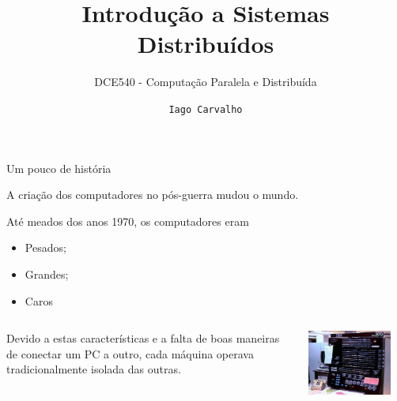 \documentclass[compress]{beamer}
\title{Introdução a Sistemas \\ Distribuídos}
\subtitle{DCE540 - Computação Paralela e Distribuída}
\author{\texttt{Iago Carvalho}}
\institute{\texttt{Departamento de Ciência da Computação}}
\begin{document}
\begin{frame}
\titlepage

\end{frame}


\begin{frame}{Um pouco de história}

A criação dos computadores no pós-guerra mudou o mundo.

\vspace{0.5cm}

Até meados dos anos 1970, os computadores eram
\begin{itemize}
    \item Pesados;
    \item Grandes;
    \item Caros
\end{itemize}

\vspace{0.5cm}

\begin{columns} %
\begin{column}{.48\textwidth}

Devido a estas características e a falta de boas maneiras de conectar um PC a outro, cada máquina operava tradicionalmente isolada das outras.

\end{column}%
\hfill%
\begin{column}{.48\textwidth}


\includegraphics[width=0.85\textwidth]{images/ibm_370.jpg}
\end{column}%
\end{columns}

\end{frame}
\end{document}
